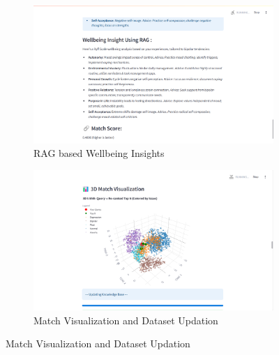 \begin{figure}[H]
    \centering
    \begin{subfigure}[b]{0.495\textwidth}
        \centering
        \includegraphics[width=\textwidth]{App Images/34 Interface.png}
        \caption*{RAG based Wellbeing Insights}
        \label{fig:wellbeing_questions}
    \end{subfigure}
    \hfill
    \begin{subfigure}[b]{0.495\textwidth}
        \centering
        \includegraphics[width=\textwidth]{App Images/35 Interface.png}
        \caption*{Match Visualization and Dataset Updation}
        \label{fig:wellbeing_result}
    \end{subfigure}
    \label{fig:wellbeing_comparison}
\end{figure}


\pagebreak
